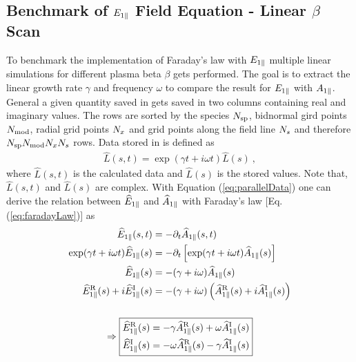 

\newpage

\subsection*{Benchmark of $E_{1\parallel}$ Field Equation - Linear $\beta$ Scan}
\label{sub:benchmarkFieldEpar}

To benchmark the implementation of Faraday's law with $E_{1\parallel}$ multiple linear simulations for different plasma beta $\beta$ gets performed. The goal is to extract the linear growth rate $\gamma$ and frequency $\omega$ to compare the result for $E_{1\parallel}$ with $A_{1\parallel}$. General a given quantity saved in  gets saved in two columns containing real and imaginary values. The rows are sorted by the species $N_\mathrm{sp}$, bidnormal gird points $N_\mathrm{mod}$, radial grid points $N_x$ and grid points along the field line $N_s$ and therefore $N_\mathrm{sp}N_\mathrm{mod}N_xN_s$ rows. Data stored in  is defined as
\begin{gather}
    \widehat{L}(s,t) = \exp (\gamma t + i\omega t) \widehat{L}(s)~,
    \label{eq:parallelData}
\end{gather}
where $\widehat{L}(s,t)$ is the calculated data and $\widehat{L}(s)$ is the stored values. \cite{GKWManual} Note that, $\widehat{L}(s,t)$ and $\widehat{L}(s)$ are complex. With Equation (\ref{eq:parallelData}) one can derive the relation between $\widehat{E}_{1\parallel}$ and $\widehat{A}_{1\parallel}$ with Faraday's law [Eq. (\ref{eq:faradayLaw})] as
\begin{gather}
    \begin{aligned}
        \widehat{E}_{1\parallel}(s,t) &= - \partial_t \widehat{A}_{1\parallel}(s,t) \\
        \exp (\gamma t + i\omega t) \widehat{E}_{1\parallel}(s) &= - \partial_t \left[\exp(\gamma t + i\omega t) \widehat{A}_{1\parallel}(s)\right] \\
        \widehat{E}_{1\parallel}(s) &= - (\gamma + i\omega) \widehat{A}_{1\parallel}(s) \\
        \widehat{E}_{1\parallel}^\mathrm{R}(s) + i \widehat{E}_{1\parallel}^\mathrm{I}(s) &= - (\gamma + i\omega) \left(\widehat{A}_{1\parallel}^\mathrm{R}(s) + i \widehat{A}_{1\parallel}^\mathrm{I}(s)\right)
    \end{aligned} \\[0.5cm] 
    \Rightarrow \boxed{
    \begin{aligned}
        \widehat{E}_{1\parallel}^\mathrm{R}(s) &= - \gamma \widehat{A}_{1\parallel}^\mathrm{R}(s) + \omega \widehat{A}_{1\parallel}^\mathrm{I}(s) \\ 
        \widehat{E}_{1\parallel}^\mathrm{I}(s) &= - \omega \widehat{A}_{1\parallel}^\mathrm{R}(s) - \gamma \widehat{A}_{1\parallel}^\mathrm{I}(s)   
    \end{aligned}
    } \nonumber
    \label{eq:parallelDataEparEqApar}
\end{gather}
\newpage
